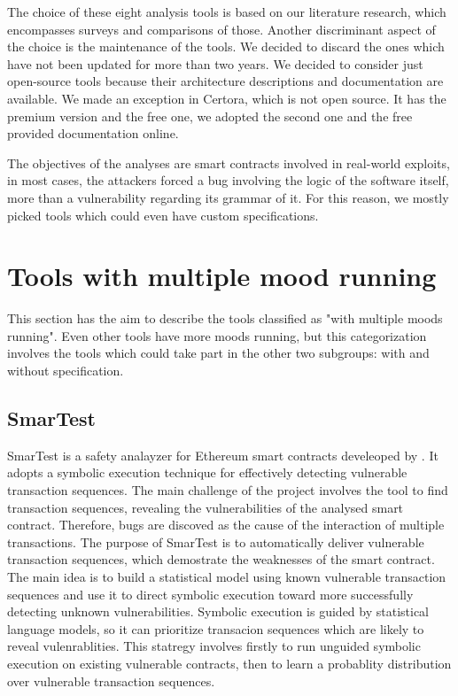 The choice of these eight analysis tools is based on our literature research, which encompasses surveys and comparisons of those. 
Another discriminant aspect of the choice is the maintenance of the tools. 
We decided to discard the ones which have not been updated for more than two years. 
We decided to consider just open-source tools because their architecture descriptions and documentation are available. We made an exception in Certora, which is not open source. 
It has the premium version and the free one, we adopted the second one and the free provided documentation online. 

The objectives of the analyses are smart contracts involved in real-world exploits, in most cases, the attackers forced a bug involving the logic of the software itself, 
more than a vulnerability regarding its grammar of it. For this reason, we mostly picked tools which could even have custom specifications.
\section{Tools with multiple mood running}
This section has the aim to describe the tools classified as "with multiple moods running". 
Even other tools have more moods running, but this categorization involves the tools which could take part in the other two subgroups: 
with and without specification.

\subsection{SmarTest}
\label{sec:WithoutSpecification:SmarTest}

SmarTest is a safety analayzer for Ethereum smart contracts develeoped by \citet{SmarTest}. 
It adopts a symbolic execution technique for effectively detecting vulnerable transaction sequences. 
The main challenge of the project involves the tool to find transaction sequences,
revealing the vulnerabilities of the analysed smart contract. Therefore, bugs are discoved as the cause of the interaction of multiple transactions.
The purpose of SmarTest is to automatically deliver vulnerable transaction sequences, 
which demostrate the weaknesses of the smart contract.
The main idea is to build a statistical model using known vulnerable transaction sequences and use it to direct symbolic execution toward 
more successfully detecting unknown vulnerabilities. 
Symbolic execution is guided by statistical language models, so it can prioritize transacion sequences which are likely to reveal vulenrablities.
This statregy involves firstly to run unguided symbolic
execution on existing vulnerable contracts, then to learn a probablity distribution over vulnerable transaction sequences.


